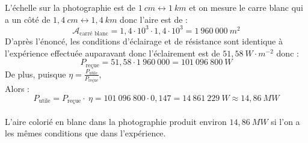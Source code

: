 \documentclass[a4paper,12pt]{scrartcl}
\begin{document}
L'échelle sur la photographie est de $1\ cm \longleftrightarrow 1\ km$ et on mesure 
le carre blanc qui a un côté de $1,4\ cm \longleftrightarrow 1,4\ km$ donc l'aire est
de :
\[\mathcal{A}_{\text{carré blanc}} = 1,4 \cdot 10^3 \cdot 1,4 \cdot 10^3 = 1\ 960\ 000\ m^2\]
D'après l'énoncé, les conditions d'éclairage et de résistance sont identique 
à l'expérience effectuée auparavant donc l'éclairement est de $51,58\ W\cdot m^{-2}$
donc :
\[P_{\text{re\c{c}ue}} = 51,58 \cdot 1\ 960\ 000 = 101\ 096\ 800\ W\]
De plus, puisque
$\eta = \frac{P_{\text{utile}}}{P_{\text{re\c{c}ue}}}$,
\\
Alors :
\[P_{\text{utile}} = P_{\text{re\c{c}ue}} \cdot \  \eta = 
101\ 096\ 800\cdot 0,147 = 14\ 861\ 229\ W \approx 14,86\ MW\]
\\
L'aire colorié en blanc dans la photographie produit environ $14,86\ MW$ si l'on
a les mêmes conditions que dans l'expérience.
\end{document}
